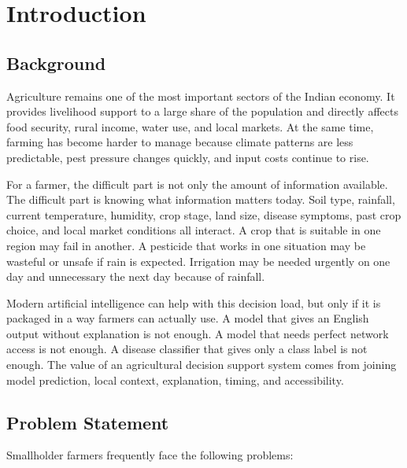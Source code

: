 \documentclass[12pt,a4paper]{report}
\begin{document}
\chapter{Introduction}
\doublespacing

\section{Background}

Agriculture remains one of the most important sectors of the Indian economy. It provides livelihood support to a large share of the population and directly affects food security, rural income, water use, and local markets. At the same time, farming has become harder to manage because climate patterns are less predictable, pest pressure changes quickly, and input costs continue to rise.

For a farmer, the difficult part is not only the amount of information available. The difficult part is knowing what information matters today. Soil type, rainfall, current temperature, humidity, crop stage, land size, disease symptoms, past crop choice, and local market conditions all interact. A crop that is suitable in one region may fail in another. A pesticide that works in one situation may be wasteful or unsafe if rain is expected. Irrigation may be needed urgently on one day and unnecessary the next day because of rainfall.

Modern artificial intelligence can help with this decision load, but only if it is packaged in a way farmers can actually use. A model that gives an English output without explanation is not enough. A model that needs perfect network access is not enough. A disease classifier that gives only a class label is not enough. The value of an agricultural decision support system comes from joining model prediction, local context, explanation, timing, and accessibility.

\section{Problem Statement}

Smallholder farmers frequently face the following problems:
\end{document}
